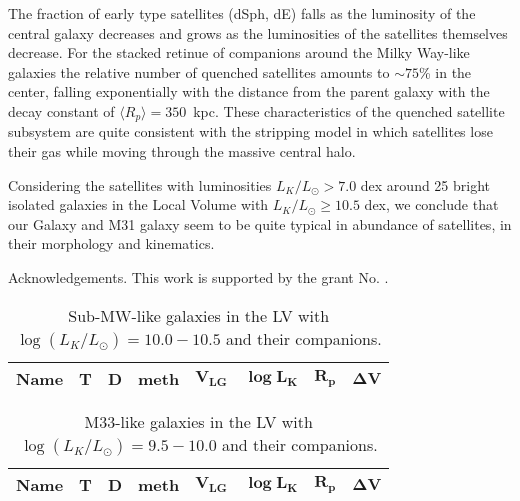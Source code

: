 \documentclass[proof]{WileyASNA-v1}
\begin{document}
The fraction of early type satellites (dSph, dE) falls as the luminosity of the
central galaxy decreases and grows as the luminosities of the satellites
themselves decrease. For the stacked retinue of companions around the Milky
Way-like galaxies the relative number of quenched satellites amounts to
$\sim75$\% in the center, falling exponentially with the distance from the
parent galaxy with the decay constant of $\langle R_p\rangle=350$~kpc. These
characteristics of the quenched satellite subsystem are quite consistent with
the stripping model in which satellites lose their gas while moving through the
massive central halo.
 
Considering the satellites with luminosities $L_K/L_{\odot}>7.0$ dex around 25
bright isolated galaxies in the Local Volume with $L_K/L_{\odot}\geq10.5$ dex,
we conclude that our Galaxy and M31 galaxy seem to be quite typical in abundance
of satellites, in their morphology and kinematics.

Acknowledgements. This work is supported by the  grant No. .


\nocite{*}%
%

\begin{center}
\begin{table}[t]%
\centering
\caption{Sub-MW-like galaxies in the LV with $\log(L_K/L_{\odot}) = 10.0-10.5$ and their companions.\label{tab2}}%
\tabcolsep=0pt%
\begin{tabular*}{20pc}{@{\extracolsep\fill}lrrlrrrr@{\extracolsep\fill}}
\toprule
\textbf{Name} & \textbf{T} & \textbf{D} & \textbf{meth} & $\boldsymbol{V_{LG}}$ &
    $\boldsymbol{\log L_K}$ & $\boldsymbol{R_p}$ & $\boldsymbol{\Delta V}$ \\
\midrule

\bottomrule
\end{tabular*}
\end{table}
\end{center}

\begin{center}
\begin{table}[t]%
\centering
\caption{M33-like galaxies in the LV with $\log(L_K/L_{\odot}) = 9.5-10.0$ and their companions.\label{tab3}}%
\tabcolsep=0pt%
\begin{tabular*}{20pc}{@{\extracolsep\fill}lrrlrrrr@{\extracolsep\fill}}
\toprule
\textbf{Name} & \textbf{T} & \textbf{D} & \textbf{meth} & $\boldsymbol{V_{LG}}$ &
    $\boldsymbol{\log L_K}$ & $\boldsymbol{R_p}$ & $\boldsymbol{\Delta V}$ \\
\midrule

\bottomrule
\end{tabular*}
\end{table}
\end{center}
\end{document}
